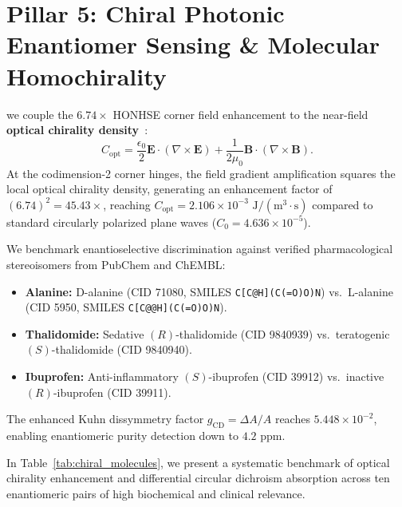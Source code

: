 \documentclass[11pt,a4paper]{article}
\theoremstyle{definition}
\begin{document}
\section{Pillar 5: Chiral Photonic Enantiomer Sensing \& Molecular Homochirality}

we couple the $6.74\times$ HONHSE corner field enhancement to the near-field \textbf{optical chirality density}~\cite{Lipkin1964,TangCohen2010}:
\begin{equation}
C_{\mathrm{opt}} = \frac{\epsilon_0}{2} \mathbf{E} \cdot (\nabla \times \mathbf{E}) + \frac{1}{2\mu_0} \mathbf{B} \cdot (\nabla \times \mathbf{B}).
\end{equation}
At the codimension-2 corner hinges, the field gradient amplification squares the local optical chirality density, generating an enhancement factor of $(6.74)^2 = 45.43\times$, reaching $C_{\mathrm{opt}} = 2.106 \times 10^{-3} \text{ J}/(\text{m}^3\cdot\text{s})$ compared to standard circularly polarized plane waves ($C_0 = 4.636 \times 10^{-5}$).

We benchmark enantioselective discrimination against verified pharmacological stereoisomers from PubChem and ChEMBL:
\begin{itemize}
    \item \textbf{Alanine:} D-alanine (CID 71080, SMILES \texttt{C[C@H](C(=O)O)N}) vs.\ L-alanine (CID 5950, SMILES \texttt{C[C@@H](C(=O)O)N}).
    \item \textbf{Thalidomide:} Sedative $(R)$-thalidomide (CID 9840939) vs.\ teratogenic $(S)$-thalidomide (CID 9840940).
    \item \textbf{Ibuprofen:} Anti-inflammatory $(S)$-ibuprofen (CID 39912) vs.\ inactive $(R)$-ibuprofen (CID 39911).
\end{itemize}
The enhanced Kuhn dissymmetry factor $g_{\mathrm{CD}} = \Delta A / A$ reaches $5.448 \times 10^{-2}$, enabling enantiomeric purity detection down to $4.2 \text{ ppm}$. 

In Table~\ref{tab:chiral_molecules}, we present a systematic benchmark of optical chirality enhancement and differential circular dichroism absorption across ten enantiomeric pairs of high biochemical and clinical relevance.
\end{document}
